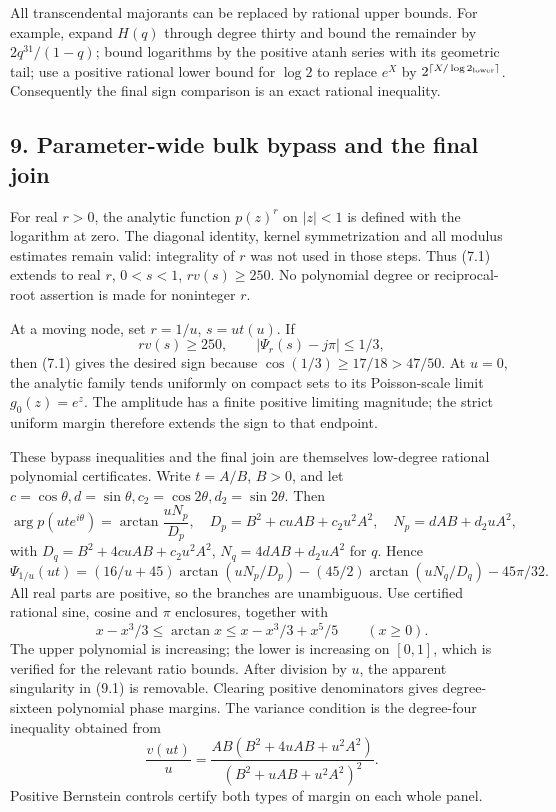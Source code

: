 \documentclass[
  11pt,
]{article}
\begin{document}
All transcendental majorants can be replaced by rational upper bounds.
For example, expand \(H(q)\) through degree thirty and bound the
remainder by \(2q^{31}/(1-q)\); bound logarithms by the positive atanh
series with its geometric tail; use a positive rational lower bound for
\(\log2\) to replace \(e^X\) by
\(2^{\lceil X/\log2_{\rm lower}\rceil}\). Consequently the final sign
comparison is an exact rational inequality.

\subsection{9. Parameter-wide bulk bypass and the final
join}\label{parameter-wide-bulk-bypass-and-the-final-join}

For real \(r>0\), the analytic function \(p(z)^r\) on \(|z|<1\) is
defined with the logarithm at zero. The diagonal identity, kernel
symmetrization and all modulus estimates remain valid: integrality of
\(r\) was not used in those steps. Thus (7.1) extends to real \(r\),
\(0<s<1\), \(rv(s)\ge250\). No polynomial degree or reciprocal-root
assertion is made for noninteger \(r\).

At a moving node, set \(r=1/u\), \(s=ut(u)\). If \[
 rv(s)\ge250,\qquad |\Psi_r(s)-j\pi|\le1/3,
\] then (7.1) gives the desired sign because
\(\cos(1/3)\ge17/18>47/50\). At \(u=0\), the analytic family tends
uniformly on compact sets to its Poisson-scale limit \(g_0(z)=e^z\). The
amplitude has a finite positive limiting magnitude; the strict uniform
margin therefore extends the sign to that endpoint.

These bypass inequalities and the final join are themselves low-degree
rational polynomial certificates. Write \(t=A/B\), \(B>0\), and let
\(c=\cos\theta,d=\sin\theta,c_2=\cos2\theta,d_2=\sin2\theta\). Then \[
 \arg p(ut e^{i\theta})=\arctan\frac{uN_p}{D_p},
\quad D_p=B^2+cuAB+c_2u^2A^2,
\quad N_p=dAB+d_2uA^2,
\] with \(D_q=B^2+4cuAB+c_2u^2A^2\), \(N_q=4dAB+d_2uA^2\) for \(q\).
Hence \[
 \Psi_{1/u}(ut)
 =(16/u+45)\arctan(uN_p/D_p)
 -(45/2)\arctan(uN_q/D_q)-45\pi/32.                          \tag{9.1}
\] All real parts are positive, so the branches are unambiguous. Use
certified rational sine, cosine and \(\pi\) enclosures, together with \[
 x-x^3/3\le\arctan x\le x-x^3/3+x^5/5\qquad(x\ge0).
\] The upper polynomial is increasing; the lower is increasing on
\([0,1]\), which is verified for the relevant ratio bounds. After
division by \(u\), the apparent singularity in (9.1) is removable.
Clearing positive denominators gives degree-sixteen polynomial phase
margins. The variance condition is the degree-four inequality obtained
from \[
 \frac{v(ut)}u=
 \frac{AB(B^2+4uAB+u^2A^2)}{(B^2+uAB+u^2A^2)^2}.              \tag{9.2}
\] Positive Bernstein controls certify both types of margin on each
whole panel.
\end{document}
